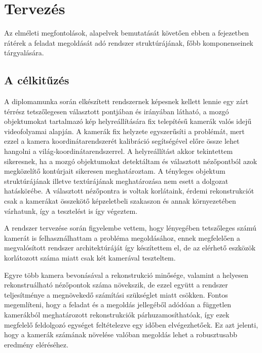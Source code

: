 \chapter{Tervezés \label{chapter3}}

Az elméleti megfontolások, alapelvek bemutatását követően ebben a fejezetben rátérek a feladat megoldását adó rendszer struktúrájának, főbb komponenseinek tárgyalására.

\section{A célkitűzés}

A diplomamunka során elkészített rendszernek képesnek kellett lennie egy zárt térrész tetszőlegesen választott pontjában és irányában látható, a mozgó objektumokat tartalmazó kép helyreállítására fix telepítésű kamerák valós idejű videofolyamai alapján. A kamerák fix helyzete egyszerűsíti a problémát, mert ezzel a kamera koordinátarendszerét kalibráció segítségével előre össze lehet hangolni a világ-koordinátarendszerrel. A helyreállítást akkor tekintettem sikeresnek, ha a mozgó objektumokat detektáltam és választott nézőpontból azok megközelítő kontúrjait sikeresen meghatároztam. A tényleges objektum struktúrájának illetve textúrájának meghatározása nem esett a dolgozat hatáskörébe. A választott nézőpontra is voltak korlátaink, érdemi rekonstrukciót csak a kamerákat összekötő képzeletbeli szakaszon és annak környezetében várhatunk, így a tesztelést is így végeztem.

A rendszer tervezése során figyelembe vettem, hogy lényegében tetszőleges számú kamerát is felhasználhattam a probléma megoldásához, ennek megfelelően a megvalósított rendszer architektúráját így készítettem el, de az elérhető eszközök korlátozott száma miatt csak két kamerával teszteltem.

Egyre több kamera bevonásával a rekonstrukció minősége, valamint a helyesen rekonstruálható nézőpontok száma növekszik, de ezzel együtt a rendszer teljesítménye a megnövekedő számítási szükséglet miatt csökken. Fontos megemlíteni, hogy a feladat és a megoldás jellegéből adódóan a független kamerákból meghatározott rekonstrukciók párhuzamosíthatóak, így ezek megfelelő feldolgozó egységet feltételezve egy időben elvégezhetőek. Ez azt jelenti, hogy a kamerák számának növelése valóban megoldás lehet a robusztusabb eredmény eléréséhez.

